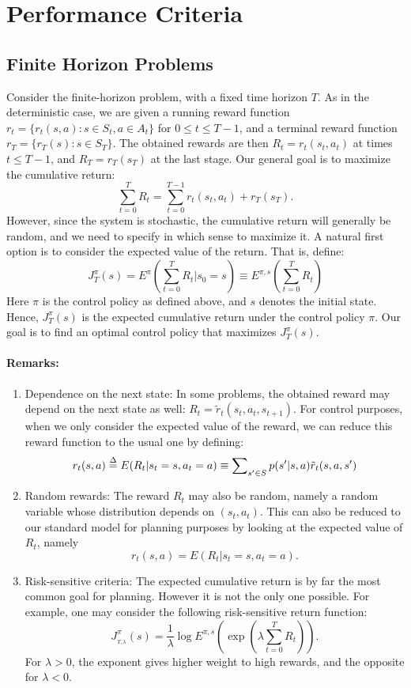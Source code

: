 \section{Performance Criteria}

\subsection{Finite Horizon Problems}
Consider the finite-horizon problem, with a fixed time horizon $T$.
As in the deterministic case, we are given a running reward function ${r_t} = \{ {r_t}(s,a):s \in {S_t},a \in {A_t}\} $ for $0 \le t \le T - 1$, and a terminal reward function ${r_T} = \{ {r_T}(s):s \in {S_T}\} $.  The obtained rewards are then ${R_t} = {r_t}({s_t},{a_t})$ at times $t \le T - 1$, and ${R_T} = {r_T}({s_T})$ at the last stage.
Our general goal is to maximize the cumulative return:
                                             \[\sum\limits_{t = 0}^T {{R_t}}  = \sum\limits_{t = 0}^{T - 1} {{r_t}({s_t},{a_t}) + {r_T}({s_T})} .\]
However, since the system is stochastic, the cumulative return will generally be random, and we need to specify in which sense to maximize it.
A natural first option is to consider the expected value of the return. That is, define:
\[J_T^\pi (s) = {E^\pi }\left(\sum\limits_{t = 0}^T {{R_t}} |{s_0} = s\right) \equiv {E^{\pi ,s}}\left(\sum\limits_{t = 0}^T {{R_t}} \right)\]
 Here $\pi $ is the control policy as defined above, and $s$ denotes the initial state. Hence,  $J_T^\pi (s)$ is the expected cumulative return under the control policy $\pi $.  Our goal is to find an optimal control policy that maximizes $J_T^\pi (s)$.

\paragraph{Remarks:}
\begin{enumerate}
  \item Dependence on the next state:  In some problems, the obtained reward may depend on the next state as well: ${R_t} = {\tilde r_t}({s_t},{a_t},{s_{t + 1}})$.  For control purposes, when we only consider the expected value of the reward, we can reduce this reward function to the usual one by defining:
\[{r_t}(s,a) \buildrel \Delta \over = E({R_t}|{s_t} = s,{a_t} = a) \equiv \sum\nolimits_{s' \in S} {p(s'|s,a){{\tilde r}_t}(} s,a,s')\]
  \item Random rewards:  The reward ${R_t}$ may also be random, namely a random variable whose distribution depends on $({s_t},{a_t})$.  This can also be reduced to our standard model for planning purposes by looking at the expected value of ${R_t}$, namely \[{r_t}(s,a) = E({R_t}|{s_t} = s,{a_t} = a).\]
  \item Risk-sensitive criteria: The expected cumulative return is by far the most common goal for planning. However it is not the only one possible. For example, one may consider the following risk-sensitive  return function:
\[J_{_{T,\lambda }}^\pi (s) = \frac{1}{\lambda }\log {E^{\pi ,s}}(\exp (\lambda \sum\limits_{t = 0}^T {{R_t}} )).\]
For $\lambda  > 0$, the exponent gives higher weight to high rewards, and the opposite for $\lambda  < 0$.
\end{enumerate}

